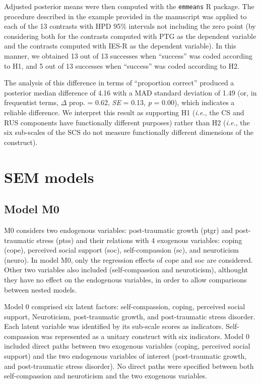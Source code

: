 \documentclass[
  english,
  man,floatsintext]{apa7}
\begin{document}
\begin{appendix}
Adjusted posterior means were then computed with the \texttt{emmeans} R
package. The procedure described in the example provided in the
manuscript was applied to each of the 13 contrasts with HPD 95\%
intervals not including the zero point (by considering both for the
contrasts computed with PTG as the dependent variable and the contrasts
computed with IES-R as the dependent variable). In this manner, we
obtained 13 out of 13 successes when ``success'' was coded according to
H1, and 5 out of 13 successes when ``success'' was coded according to
H2.

The analysis of this difference in terms of ``proportion correct''
produced a posterior median difference of 4.16 with a MAD standard
deviation of 1.49 (or, in frequentist terms, \(\Delta\) prop. = 0.62,
\emph{SE} = 0.13, \emph{p} = 0.00), which indicates a reliable
difference. We interpret this result as supporting H1 (\emph{i.e.}, the
CS and RUS components have functionally different purposes) rather than
H2 (\emph{i.e.}, the six sub-scales of the SCS do not measure
functionally different dimensions of the construct).

\newpage

\hypertarget{sem-models}{%
\section{SEM models}\label{sem-models}}

\hypertarget{model-m0}{%
\subsection{Model M0}\label{model-m0}}

M0 considers two endogenous variables: post-traumatic growth (ptgr) and
post-traumatic stress (ptss) and their relations with 4 exogenous
variables: coping (cope), perceived social support (soc),
self-compassion (sc), and neuroticism (neuro). In model M0, only the
regression effects of cope and soc are considered. Other two variables
also included (self-compassion and neuroticism), althought they have no
effect on the endogenous variables, in order to allow comparisons
between nested models.

Model 0 comprised six latent factors: self-compassion, coping, perceived
social support, Neuroticism, post-traumatic growth, and post-traumatic
stress disorder. Each latent variable was identified by its sub-scale
scores as indicators. Self-compassion was represented as a unitary
construct with six indicators. Model 0 included direct paths between two
exogenous variables (coping, perceived social support) and the two
endogenous variables of interest (post-traumatic growth, and
post-traumatic stress disorder). No direct paths were specified between
both self-compassion and neuroticism and the two exogenous variables.


\end{appendix}
\end{document}
